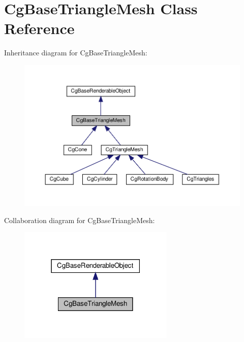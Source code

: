 \hypertarget{class_cg_base_triangle_mesh}{}\section{Cg\+Base\+Triangle\+Mesh Class Reference}
\label{class_cg_base_triangle_mesh}


Inheritance diagram for Cg\+Base\+Triangle\+Mesh\+:
\nopagebreak
\begin{figure}[H]
\begin{center}
\leavevmode
\includegraphics[width=350pt]{class_cg_base_triangle_mesh__inherit__graph}
\end{center}
\end{figure}


Collaboration diagram for Cg\+Base\+Triangle\+Mesh\+:
\nopagebreak
\begin{figure}[H]
\begin{center}
\leavevmode
\includegraphics[width=210pt]{class_cg_base_triangle_mesh__coll__graph}
\end{center}
\end{figure}
